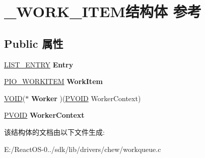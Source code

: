 \hypertarget{struct___w_o_r_k___i_t_e_m}{}\section{\+\_\+\+W\+O\+R\+K\+\_\+\+I\+T\+E\+M结构体 参考}
\label{struct___w_o_r_k___i_t_e_m}
\subsection*{Public 属性}
\begin{DoxyCompactItemize}
\item 
\mbox{\label{struct___w_o_r_k___i_t_e_m_a9afc259abaee12958a27aec27cf41d18}} 
\hyperlink{struct___l_i_s_t___e_n_t_r_y}{L\+I\+S\+T\+\_\+\+E\+N\+T\+RY} {\bfseries Entry}
\item 
\mbox{\label{struct___w_o_r_k___i_t_e_m_abc18d910b926248517501baa3b90c7b5}} 
\hyperlink{struct___i_o___w_o_r_k_i_t_e_m}{P\+I\+O\+\_\+\+W\+O\+R\+K\+I\+T\+EM} {\bfseries Work\+Item}
\item 
\mbox{\label{struct___w_o_r_k___i_t_e_m_ae65d3b7785f68ffae09de5f45ca03fa4}} 
\hyperlink{interfacevoid}{V\+O\+ID}($\ast$ {\bfseries Worker} )(\hyperlink{interfacevoid}{P\+V\+O\+ID} Worker\+Context)
\item 
\mbox{\label{struct___w_o_r_k___i_t_e_m_a9113fe60c0556a6d0bcf12fd9bfc4c1a}} 
\hyperlink{interfacevoid}{P\+V\+O\+ID} {\bfseries Worker\+Context}
\end{DoxyCompactItemize}


该结构体的文档由以下文件生成\+:\begin{DoxyCompactItemize}
\item 
E\+:/\+React\+O\+S-\/0../sdk/lib/drivers/chew/workqueue.\+c\end{DoxyCompactItemize}
